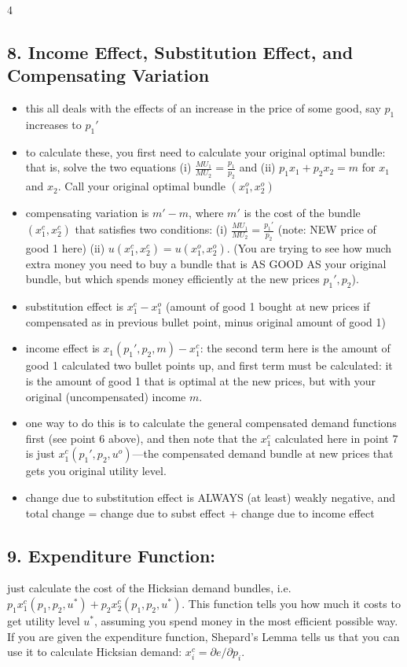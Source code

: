 \documentclass[8pt,landscape]{extarticle}
\begin{document}
\begin{multicols}{4}
\subsection*{8. Income Effect, Substitution Effect, and Compensating Variation}
\begin{itemize}[leftmargin=*,noitemsep,topsep=0pt]
\item this all deals with the effects of an increase in the price of some good, say $p_1$ increases to $p_1'$
\item to calculate these, you first need to calculate your original optimal bundle: that is, solve the two equations (i) $\frac{MU_1}{MU_2} = \frac{p_1}{p_2}$ and (ii) $p_1 x_1 + p_2 x_2 = m$ for $x_1$ and $x_2$. Call your original optimal bundle $(x_1^o,x_2^o)$
\item compensating variation is $m' - m$, where $m'$ is the cost of the bundle $(x_1^c,x_2^c)$ that satisfies two conditions: (i) $\frac{MU_1}{MU_2} = \frac{p_1'}{p_2}$ (note: NEW price of good 1 here) (ii) $u(x_1^c,x_2^c) = u(x_1^o,x_2^o)$. (You are trying to see how much extra money you need to buy a bundle that is AS GOOD AS your original bundle, but which spends money efficiently at the new prices $p_1',p_2$).
\item substitution effect is $x_1^c - x_1^o$ (amount of good 1 bought at new prices if compensated as in previous bullet point, minus original amount of good 1)
\item income effect is $x_1(p_1',p_2,m) - x_1^c$: the second term here is the amount of good 1 calculated two bullet points up, and first term must be calculated: it is the amount of good 1 that is optimal at the new prices, but with your original (uncompensated) income $m$.
\item one way to do this is to calculate the general compensated demand functions first (see point 6 above), and then note that the $x_1^c$ calculated here in point 7 is just $x_1^c(p_1',p_2,u^o)$---the compensated demand bundle at new prices that gets you original utility level.
\item change due to substitution effect is ALWAYS (at least) weakly negative, and total change = change due to subst effect + change due to income effect
\end{itemize}

\subsection*{9. Expenditure Function:}
just calculate the cost of the Hicksian demand bundles, i.e. $p_1 x_1^c(p_1,p_2,u^*) + p_2 x_2^c(p_1,p_2,u^*)$. This function tells you how much it costs to get utility level $u^*$, assuming you spend money in the most efficient possible way. If you are given the expenditure function, Shepard's Lemma tells us that you can use it to calculate Hicksian demand: $x_i^c = \partial e/\partial p_i$.


\end{multicols}
\end{document}
